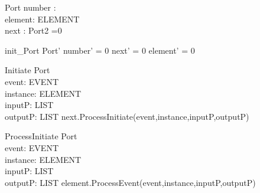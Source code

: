 \begin{schema}{Port}
number : \nat \\
element: ELEMENT \\
next : Port2
=0
\end{schema}


\begin{zed}
init\_Port \sdef \lsch Port' \bbar number' = 0 \land next' = 0 \land element' = 0  \rsch  \end{zed}

\begin{schema}{Initiate}
\Delta Port \\
event: EVENT \\
instance: ELEMENT \\
inputP: LIST \\
outputP: LIST 
\where
next.ProcessInitiate(event,instance,inputP,outputP) 
\end{schema}

\begin{schema}{ProcessInitiate}
\Delta Port \\
event: EVENT \\
instance: ELEMENT \\
inputP: LIST \\
outputP: LIST 
\where
element.ProcessEvent(event,instance,inputP,outputP)
\end{schema}